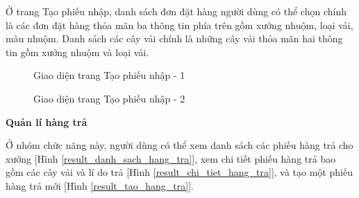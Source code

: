 Ở trang Tạo phiếu nhập, danh sách đơn đặt hàng người dùng có thể chọn chính là các đơn đặt hàng thỏa mãn ba thông tin phía trên gồm xưởng nhuộm, loại vải, màu nhuộm. Danh sách các cây vải chính là những cây vải thỏa mãn hai thông tin gồm xưởng nhuộm và loại vải. \par

\begin{figure}[H]
    \begin{center}
        \caption{Giao diện trang Tạo phiếu nhập - 1}
        \label{result_tao_phieu_nhap_1}
    \end{center}
\end{figure}

\begin{figure}[H]
    \begin{center}
        \caption{Giao diện trang Tạo phiếu nhập - 2}
        \label{result_tao_phieu_nhap_2}
    \end{center}
\end{figure}

\textbf{Quản lí hàng trả}

Ở nhóm chức năng này, người dùng có thể xem danh sách các phiếu hàng trả cho xưởng [Hình \ref{result_danh_sach_hang_tra}], xem chi tiết phiếu hàng trả bao gồm các cây vải và lí do trả [Hình \ref{result_chi_tiet_hang_tra}], và tạo một phiếu hàng trả mới [Hình \ref{result_tao_hang_tra}].

